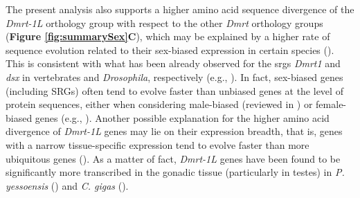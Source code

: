 \documentclass[../main.tex]{subfiles}
\begin{document}
The present analysis also supports a higher amino acid sequence divergence of the \textit{Dmrt-1L} orthology group with respect to the other \textit{Dmrt} orthology groups (\textbf{Figure \ref{fig:summarySex}C}), which may be explained by a higher rate of sequence evolution related to their sex-biased expression in certain species (\textbf{\cite{zhang2014genomic,shi2015novo,li2018foxl2,evensen2022comparative}}). This is consistent with what has been already observed for the \glspl{srg} \textit{Dmrt1} and \textit{dsx} in vertebrates and \textit{Drosophila}, respectively (e.g., \textbf{\cite{bewick2011evolution,baral2019genetic}}). In fact, sex-biased genes (including SRGs) often tend to evolve faster than unbiased genes at the level of protein sequences, either when considering male-biased (reviewed in \textbf{\cite{parsch2013evolutionary,grath2016sex}}) or female-biased genes (e.g., \textbf{\cite{papa2017rapid,ghiselli2018comparative}}). Another possible explanation for the higher amino acid divergence of \textit{Dmrt-1L} genes may lie on their expression breadth, that is, genes with a narrow tissue-specific expression tend to evolve faster than more ubiquitous genes (\textbf{\cite{parsch2013evolutionary,xu2022multi}}). As a matter of fact, \textit{Dmrt-1L} genes have been found to be significantly more transcribed in the gonadic tissue (particularly in testes) in \textit{P. yessoensis} (\textbf{\cite{li2018foxl2}}) and \textit{C. gigas} (\textbf{\cite{yue2021variance}}).
\end{document}
